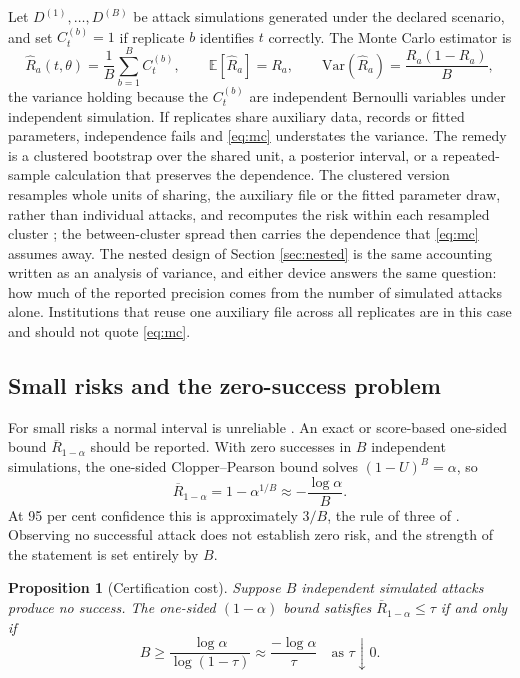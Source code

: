 \documentclass[11pt,a4paper]{article}
\theoremstyle{plain}
\newtheorem{proposition}{Proposition}
\theoremstyle{definition}
\theoremstyle{definition}
\theoremstyle{plain}
\newcommand{\E}{\mathbb{E}}
\begin{document}
Let $D^{(1)}, \dots, D^{(B)}$ be attack simulations generated under the
declared scenario, and set $C_t^{(b)} = 1$ if replicate $b$ identifies $t$
correctly. The Monte Carlo estimator is
\begin{equation}
\widehat{R}_a(t, \theta) = \frac{1}{B}\sum_{b=1}^{B} C_t^{(b)},
\qquad
\E[\widehat{R}_a] = R_a, \qquad
\mathrm{Var}(\widehat{R}_a) = \frac{R_a(1 - R_a)}{B} ,
\label{eq:mc}
\end{equation}
the variance holding because the $C_t^{(b)}$ are independent Bernoulli
variables under independent simulation. If replicates share auxiliary data,
records or fitted parameters, independence fails and \eqref{eq:mc} understates
the variance. The remedy is a clustered bootstrap over the shared unit, a
posterior interval, or a repeated-sample calculation that preserves the
dependence. The clustered version resamples whole units of sharing, the
auxiliary file or the fitted parameter draw, rather than individual attacks, and
recomputes the risk within each resampled cluster
\citep{efron1993,vandervaart1998}; the between-cluster spread then carries the
dependence that \eqref{eq:mc} assumes away. The nested design of Section
\ref{sec:nested} is the same accounting written as an analysis of variance, and
either device answers the same question: how much of the reported precision comes
from the number of simulated attacks alone. Institutions that reuse one auxiliary
file across all replicates are in this case and should not quote
\eqref{eq:mc}.

\subsection{Small risks and the zero-success problem}

For small risks a normal interval is unreliable \citep{brown2001}. An exact or
score-based one-sided bound $\overline{R}_{1-\alpha}$ should be reported. With zero
successes in $B$ independent simulations, the one-sided Clopper--Pearson bound
\citep{clopper1934} solves $(1 - U)^B = \alpha$, so
\begin{equation}
\overline{R}_{1-\alpha} = 1 - \alpha^{1/B} \approx -\frac{\log \alpha}{B} .
\label{eq:cp0}
\end{equation}
At 95 per cent confidence this is approximately $3/B$, the rule of three of
\citet{hanley1983}. Observing no successful
attack does not establish zero risk, and the strength of the statement is set
entirely by $B$.

\begin{proposition}[Certification cost]\label{prop:cert}
Suppose $B$ independent simulated attacks produce no success. The one-sided
$(1-\alpha)$ bound satisfies $\overline{R}_{1-\alpha} \leq \tau$ if and only if
\begin{equation}
B \geq \frac{\log \alpha}{\log(1 - \tau)} \approx \frac{-\log\alpha}{\tau}
\quad \text{as } \tau \downarrow 0 .
\label{eq:cert}
\end{equation}
\end{proposition}
\end{document}
